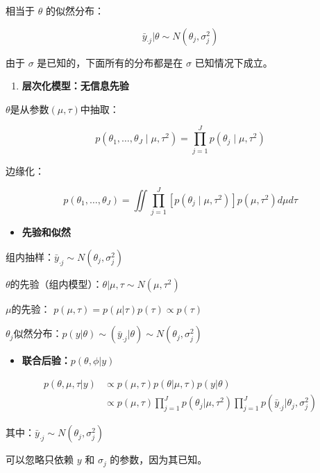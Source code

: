 相当于 \(\theta\) 的似然分布：

\[\bar y_{\cdot j}|\theta \sim N(\theta_j,\sigma^2_j)\]

由于 \(\sigma\) 是已知的，下面所有的分布都是在 \(\sigma\)
已知情况下成立。

\begin{enumerate}
\def\labelenumi{\arabic{enumi}.}
\item
  \textbf{层次化模型：无信息先验}
\end{enumerate}

\(\theta\)是从参数\((\mu,\tau)\)中抽取：

\[p\left(\theta_{1}, \ldots, \theta_{J} \mid \mu, \tau^{2}\right)=\prod_{j=1}^{J} p\left(\theta_{j} \mid \mu, \tau^{2}\right)\]

边缘化：

\[p\left(\theta_{1}, \ldots, \theta_{J}\right)=
\iint \prod_{j=1}^{J}
\left[p\left(\theta_{j} \mid \mu, \tau^{2}\right)\right] 
p\left(\mu, \tau^{2}\right)
d \mu d \tau\]

\begin{itemize}
\item
  \textbf{先验和似然}
\end{itemize}

组内抽样：\(\bar y_{\cdot j} \sim N(\theta_j,\sigma^2_j)\)

\(\theta\)的先验（组内模型）：\(\theta|\mu,\tau \sim N(\mu,\tau^2)\)

\(\mu\)的先验： \(p(\mu,\tau)=p(\mu|\tau)p(\tau)\propto p(\tau)\)

\(\theta_j\)似然分布：\(p(y|\theta)\sim(\bar y_{\cdot j}|\theta) \sim N(\theta_j,\sigma^2_j)\)

\begin{itemize}
\item
  \textbf{联合后验：}\(p(\theta,\phi|y)\)
\end{itemize}

\begin{equation}
  \begin{aligned}
    p(\theta,\mu,\tau|y)
    &\propto p(\mu,\tau)p(\theta|\mu,\tau)p(y|\theta)\\
    &\propto p(\mu,\tau)\prod_{j=1}^{J}p(\theta_j|\mu,\tau^2)
    \prod_{j=1}^{J}p(\bar y _{\cdot j}|\theta_j,\sigma^2_j)
    \end{aligned}
\end{equation}


其中：\(\bar y _{\cdot j}\sim N(\theta_j,\sigma_j^2)\)

可以忽略只依赖 \(y\) 和 \(\sigma_j\) 的参数，因为其已知。

